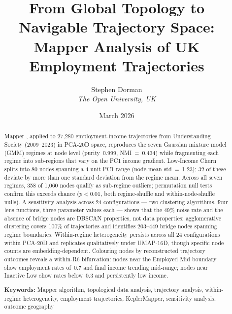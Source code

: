 \documentclass[12pt, a4paper]{article}
\title{From Global Topology to Navigable Trajectory Space:\\
  Mapper Analysis of UK Employment Trajectories}
\author{%
  Stephen Dorman\\
  \textit{The Open University, UK}
}
\date{March 2026}
\newcommand{\pval}{\textit{p}}  %
\begin{document}
\maketitle

\begin{abstract}
Mapper \citep{singh2007topological}, applied to 27,280 employment-income
trajectories from Understanding Society (2009--2023) in PCA-20D space,
reproduces the seven Gaussian mixture model (GMM) regimes at node level
(purity~0.999, NMI~=~0.434) while fragmenting each regime into sub-regions
that vary on the PC1 income gradient. Low-Income Churn splits into 80 nodes
spanning a 4-unit PC1 range (node-mean std~=~1.23); 32 of these deviate by
more than one standard deviation from the regime mean. Across all seven
regimes, 358 of 1,060 nodes qualify as sub-regime outliers; permutation null
tests confirm this exceeds chance ($\pval < 0.01$, both regime-shuffle and
within-node-shuffle nulls). A sensitivity analysis across 24
configurations --- two clustering algorithms, four lens functions, three
parameter values each --- shows that the 49\% noise rate and the absence of
bridge nodes are DBSCAN properties, not data properties: agglomerative
clustering covers 100\% of trajectories and identifies 203--449 bridge nodes
spanning regime boundaries. Within-regime heterogeneity persists across all 24
configurations within PCA-20D and replicates qualitatively under UMAP-16D,
though specific node counts are embedding-dependent. Colouring nodes by
reconstructed trajectory outcomes reveals a within-R6 bifurcation: nodes near
the Employed Mid boundary show employment rates of~0.7 and final income
trending mid-range; nodes near Inactive Low show rates below~0.3 and
persistently low income.

\medskip\noindent\textbf{Keywords:} Mapper algorithm, topological data analysis,
trajectory analysis, within-regime heterogeneity, employment trajectories,
KeplerMapper, sensitivity analysis, outcome geography
\end{abstract}




\end{document}
